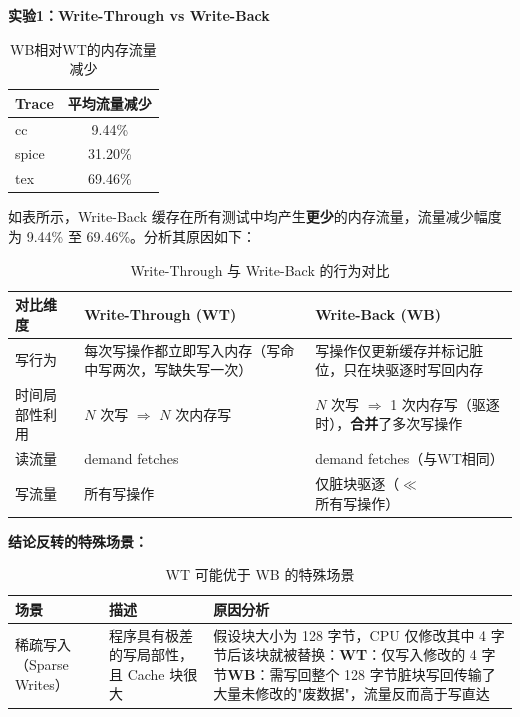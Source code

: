 \documentclass[12pt,a4paper]{article}
\begin{document}
\textbf{实验1：Write-Through vs Write-Back}

\begin{table}[H]
\centering
\caption{WB相对WT的内存流量减少}
\begin{tabular}{|l|c|}
\hline
\textbf{Trace} & \textbf{平均流量减少} \\
\hline
cc & 9.44\% \\
spice & 31.20\% \\
tex & 69.46\% \\
\hline
\end{tabular}
\end{table}

如表所示，Write-Back 缓存在所有测试中均产生\textbf{更少}的内存流量，流量减少幅度为 9.44\% 至 69.46\%。分析其原因如下：

\begin{table}[H]
\centering
\small
\caption{Write-Through 与 Write-Back 的行为对比}
\begin{tabular}{p{3.5cm}p{5.5cm}p{5.5cm}}
\toprule
\textbf{对比维度} & \textbf{Write-Through (WT)} & \textbf{Write-Back (WB)} \\
\midrule
写行为 & 每次写操作都立即写入内存（写命中写两次，写缺失写一次） & 写操作仅更新缓存并标记脏位，只在块驱逐时写回内存 \\
\midrule
时间局部性利用 & $N$ 次写 $\Rightarrow$ $N$ 次内存写 & $N$ 次写 $\Rightarrow$ 1 次内存写（驱逐时），\textbf{合并}了多次写操作 \\
\midrule
读流量 & demand fetches & demand fetches（与WT相同） \\
\midrule
写流量 & 所有写操作 & 仅脏块驱逐（$\ll$ 所有写操作） \\
\bottomrule
\end{tabular}
\end{table}

\textbf{结论反转的特殊场景：}

\begin{table}[H]
\centering
\small
\caption{WT 可能优于 WB 的特殊场景}
\begin{tabular}{p{3cm}p{5.5cm}p{6cm}}
\toprule
\textbf{场景} & \textbf{描述} & \textbf{原因分析} \\
\midrule
稀疏写入（Sparse Writes） & 程序具有极差的写局部性，且 Cache 块很大 & 假设块大小为 128 字节，CPU 仅修改其中 4 字节后该块就被替换：\newline \textbf{WT}：仅写入修改的 4 字节\newline \textbf{WB}：需写回整个 128 字节脏块\newline 写回传输了大量未修改的"废数据"，流量反而高于写直达 \\
\bottomrule
\end{tabular}
\end{table}
\end{document}
